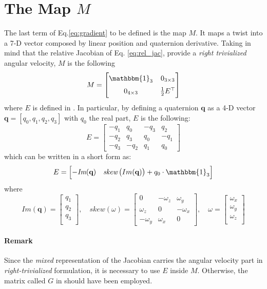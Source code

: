 \section{The Map $M$}

The last term of Eq.\eqref{eq:gradient} to be defined is the map $M$. It maps a twist into a 7-D vector composed by linear position and quaternion derivative. Taking in mind that the relative Jacobian of Eq. \eqref{eq:rel_jac}, provide a \textit{right trivialized} angular velocity, $M$ is the following
\begin{equation}
M = \begin{bmatrix}
			\mathbbm{1}_3 & 0_{3\times3}\\[6pt]
			0_{4\times3}  & \frac{1}{2}E^\top
	\end{bmatrix}
\end{equation}
where $E$ is defined in \cite{graf2008quaternions}. In particular, by defining a quaternion $\textbf{q}$ as a 4-D vector $\textbf{q} = \left[q_0, q_1, q_2, q_3\right]$ with $q_0$ the real part, $E$ is the following:
\begin{equation}
E=
\begin{bmatrix}
-q_1 & q_0 & -q_3 & q_2\\
-q_2 & q_3 & q_0 & -q_1\\
-q_3 & -q_2 & q_1 & q_0
\end{bmatrix}
\end{equation}
which can be written in a short form as:
\begin{equation}
E = \begin{bmatrix}
	-\textit{Im}(\textbf{q}) & \textit{skew}\left(Im(\textbf{q})\right)+q_0\cdot\mathbbm{1}_3
\end{bmatrix}
\end{equation}
where
\begin{equation}
Im(\textbf{q}) = \begin{bmatrix}
q_1 \\
q_2 \\
q_3 \\
\end{bmatrix}, \quad \textit{skew}(\omega) = \begin{bmatrix}
													0 & -\omega_z & \omega_y\\
													\omega_z & 0 & -\omega_x\\
													-\omega_y & \omega_x & 0
											\end{bmatrix}, \quad \omega = \begin{bmatrix}
											\omega_x \\
											\omega_y \\
											\omega_z \\
											\end{bmatrix}
\end{equation}

\paragraph{Remark}
Since the \textit{mixed} representation of the Jacobian carries the angular velocity part in \textit{right-trivialized} formulation, it is necessary to use $E$ inside $M$. Otherwise, the matrix called $G$ in \cite{graf2008quaternions} should have been employed.